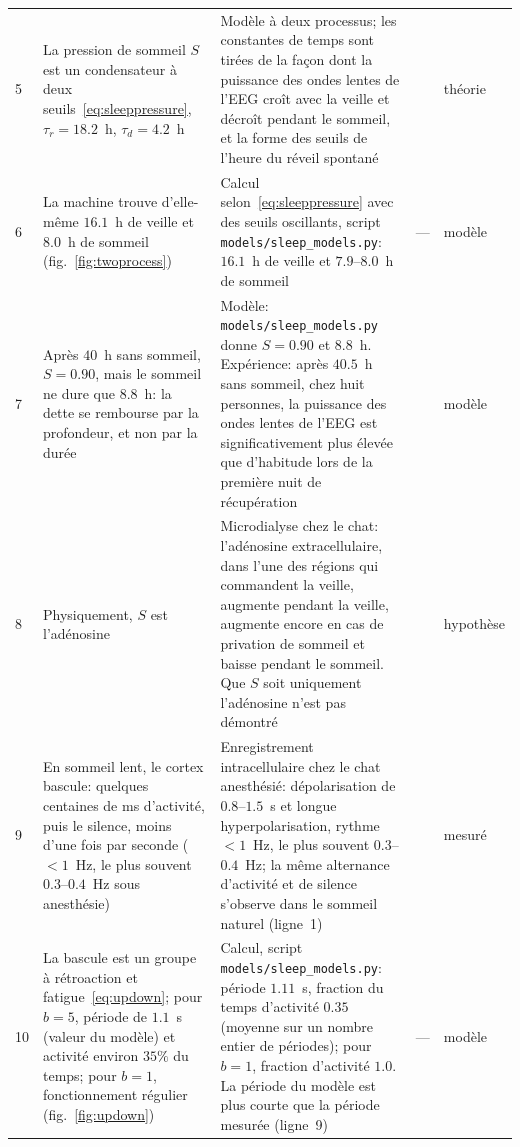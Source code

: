 {\begin{longtable}{>{\raggedright}p{0.5cm}>{\raggedright}p{4.0cm}>{\raggedright}p{5.6cm}>{\raggedright}p{2.3cm}>{\raggedright\arraybackslash}p{1.7cm}}
5 & La pression de sommeil $S$ est un condensateur à deux seuils~\eqref{eq:sleeppressure}, $\tau_r=18.2$~h, $\tau_d=4.2$~h & Modèle à deux processus; les constantes de temps sont tirées de la façon dont la puissance des ondes lentes de l'EEG croît avec la veille et décroît pendant le sommeil, et la forme des seuils de l'heure du réveil spontané & \cite{Borbely1982,Daan1984} & théorie \\
6 & La machine trouve d'elle-même $16.1$~h de veille et $8.0$~h de sommeil (fig.~\ref{fig:twoprocess}) & Calcul selon~\eqref{eq:sleeppressure} avec des seuils oscillants, script \texttt{models/sleep\_models.py}: $16.1$~h de veille et $7.9$--$8.0$~h de sommeil & --- & modèle \\
7 & Après $40$~h sans sommeil, $S=0.90$, mais le sommeil ne dure que $8.8$~h: la dette se rembourse par la profondeur, et non par la durée & Modèle: \texttt{models/sleep\_models.py} donne $S=0.90$ et $8.8$~h. Expérience: après $40.5$~h sans sommeil, chez huit personnes, la puissance des ondes lentes de l'EEG est significativement plus élevée que d'habitude lors de la première nuit de récupération & \cite{Borbely1981} & modèle \\
8 & Physiquement, $S$ est l'adénosine & Microdialyse chez le chat: l'adénosine extracellulaire, dans l'une des régions qui commandent la veille, augmente pendant la veille, augmente encore en cas de privation de sommeil et baisse pendant le sommeil. Que $S$ soit uniquement l'adénosine n'est pas démontré & \cite{PorkkaHeiskanen1997,Dunwiddie2001} & hypothèse \\
9 & En sommeil lent, le cortex bascule: quelques centaines de ms d'activité, puis le silence, moins d'une fois par seconde ($<1$~Hz, le plus souvent $0.3$--$0.4$~Hz sous anesthésie) & Enregistrement intracellulaire chez le chat anesthésié: dépolarisation de $0.8$--$1.5$~s et longue hyperpolarisation, rythme $<1$~Hz, le plus souvent $0.3$--$0.4$~Hz; la même alternance d'activité et de silence s'observe dans le sommeil naturel (ligne~1) & \cite{Steriade1993,Vyazovskiy2009} & mesuré \\
10 & La bascule est un groupe à rétroaction et fatigue~\eqref{eq:updown}; pour $b=5$, période de $1.1$~s (valeur du modèle) et activité environ $35\%$ du temps; pour $b=1$, fonctionnement régulier (fig.~\ref{fig:updown}) & Calcul, script \texttt{models/sleep\_models.py}: période $1.11$~s, fraction du temps d'activité $0.35$ (moyenne sur un nombre entier de périodes); pour $b=1$, fraction d'activité $1.0$. La période du modèle est plus courte que la période mesurée (ligne~9) & --- & modèle \\

\end{longtable}}
